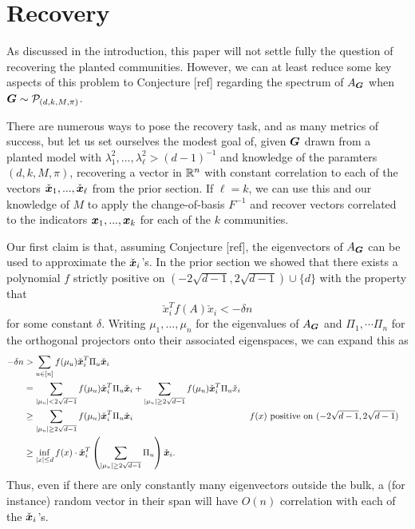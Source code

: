 \section{Recovery} %
\label{sec:recovery}

As discussed in the introduction, this paper will not settle fully the question of recovering the planted communities. However, we can at least reduce some key aspects of this problem to Conjecture [ref] regarding the spectrum of $A_{\boldsymbol{G}}$ when $\boldsymbol{G} \sim \mathcal{P}_{(d,k,M,\pi)}$.

There are numerous ways to pose the recovery task, and as many metrics of success, but let us set ourselves the modest goal of, given $\boldsymbol{G}$ drawn from a planted model with $\lambda_1^2,...,\lambda_\ell^2 > (d-1)^{-1}$ and knowledge of the paramters $(d,k,M,\pi)$, recovering a vector in $\mathbb{R}^n$ with constant correlation to each of the vectors $\check {{\boldsymbol{x}}}_1,...,\check {{\boldsymbol{x}}}_\ell$ from the prior section. If $\ell = k$, we can use this and our knowledge of $M$ to apply the change-of-basis $F^{-1}$ and recover vectors correlated to the indicators ${\boldsymbol{x}}_1,...,{\boldsymbol{x}}_k$ for each of the $k$ communities. 

Our first claim is that, assuming Conjecture [ref], the eigenvectors of $A_{\boldsymbol{G}}$ can be used to approximate the $\check {{\boldsymbol{x}}}_i$'s. In the prior section we showed that there exists a polynomial $f$ strictly positive on $(-2\sqrt{d-1},2\sqrt{d-1}) \cup \{d\}$ with the property that
$$
	\check x_i^T f(A) \check x_i < -\delta n
$$
for some constant $\delta$. Writing $\mu_1,...,\mu_n$ for the eigenvalues of $A_{\boldsymbol{G}}$ and $\Pi_1, \cdots \Pi_n$ for the orthogonal projectors onto their associated eigenspaces, we can expand this as
\begin{align*}
	-\delta n &> \sum_{u \in [n]} f(\mu_u) \check {{\boldsymbol{x}}}_i^T \Pi_u \check {{\boldsymbol{x}}}_i \\
	&= \sum_{|\mu_u| < 2\sqrt{d-1}}f(\mu_u) \check {{\boldsymbol{x}}}_i^T \Pi_u \check {{\boldsymbol{x}}}_i + \sum_{|\mu_u| \ge 2\sqrt{d-1}}f(\mu_u) \check {{\boldsymbol{x}}}_i^T \Pi_u \check x_i \\
	&\ge \sum_{|\mu_u| \ge 2\sqrt{d-1}}f(\mu_u) \check {{\boldsymbol{x}}}_i^T \Pi_u \check {{\boldsymbol{x}}}_i & & f(x) \text{ positive on $(-2\sqrt{d-1},2\sqrt{d-1})$} \\
	&\ge \inf_{|x| \le d}f(x) \cdot \check {{\boldsymbol{x}}}_i^T \left(\sum_{|\mu_u| \ge 2\sqrt{d-1}} \Pi_u \right) \check {{\boldsymbol{x}}}_i.
\end{align*}
Thus, even if there are only constantly many eigenvectors outside the bulk, a (for instance) random vector in their span will have $O(n)$ correlation with each of the $\check {{\boldsymbol{x}}}_i$'s.

